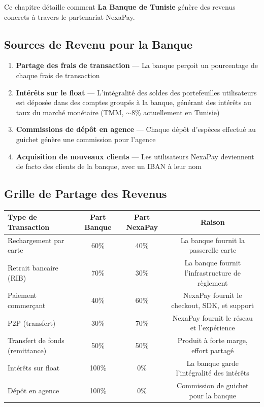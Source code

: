 \documentclass[11pt,a4paper]{article}
\begin{document}
Ce chapitre d\'etaille comment \textbf{La Banque de Tunisie} g\'en\`ere des revenus concrets \`a travers le partenariat NexaPay.

\subsection{Sources de Revenu pour la Banque}

\begin{enumerate}[leftmargin=*]
    \item \textbf{Partage des frais de transaction} --- La banque per\c{c}oit un pourcentage de chaque frais de transaction
    \item \textbf{Int\'er\^ets sur le float} --- L'int\'egralit\'e des soldes des portefeuilles utilisateurs est d\'epos\'ee dans des comptes group\'es \`a la banque, g\'en\'erant des int\'er\^ets au taux du march\'e mon\'etaire (TMM, $\sim$8\% actuellement en Tunisie)
    \item \textbf{Commissions de d\'ep\^ot en agence} --- Chaque d\'ep\^ot d'esp\`eces effectu\'e au guichet g\'en\`ere une commission pour l'agence
    \item \textbf{Acquisition de nouveaux clients} --- Les utilisateurs NexaPay deviennent de facto des clients de la banque, avec un IBAN \`a leur nom
\end{enumerate}

\subsection{Grille de Partage des Revenus}

\begin{center}
\begin{tabular}{|l|c|c|c|}
\hline
\textbf{Type de Transaction} & \textbf{Part Banque} & \textbf{Part NexaPay} & \textbf{Raison} \\
\hline
Rechargement par carte   & 60\% & 40\% & La banque fournit la passerelle carte \\
Retrait bancaire (RIB)   & 70\% & 30\% & La banque fournit l'infrastructure de r\`eglement \\
Paiement commer\c{c}ant  & 40\% & 60\% & NexaPay fournit le checkout, SDK, et support \\
P2P (transfert)          & 30\% & 70\% & NexaPay fournit le r\'eseau et l'exp\'erience \\
Transfert de fonds (remittance) & 50\% & 50\% & Produit \`a forte marge, effort partag\'e \\
Int\'er\^ets sur float   & 100\% & 0\%  & La banque garde l'int\'egralit\'e des int\'er\^ets \\
D\'ep\^ot en agence      & 100\% & 0\%  & Commission de guichet pour la banque \\
\hline
\end{tabular}
\end{center}
\end{document}
